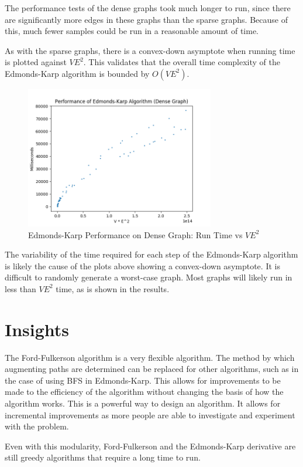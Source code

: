 \documentclass[conference]{IEEEtran}
\begin{document}
The performance tests of the dense graphs took much longer to run, since there are significantly
more edges in these graphs than the sparse graphs. Because of this, much fewer samples could be 
run in a reasonable amount of time. 

As with the sparse graphs, there is a convex-down asymptote when running time is plotted against
$VE^2$. This validates that the overall time complexity of the Edmonds-Karp algorithm is bounded 
by $O(VE^2)$.
\begin{figure}
	\centering
	\includegraphics[width=3.25in]{Edmonds-Karp_Dense.png}
	\caption{Edmonds-Karp Performance on Dense Graph: Run Time vs $VE^2$}
	\label{ff_perf_dense}
\end{figure}

The variability of the time required for each step of the Edmonds-Karp algorithm is likely the 
cause of the plots above showing a convex-down asymptote. It is difficult to randomly generate
a worst-case graph. Most graphs will likely run in less than $VE^2$ time, as is shown in the 
results.

\section{Insights}
The Ford-Fulkerson algorithm is a very flexible algorithm. The method by which augmenting paths 
are determined can be replaced for other algorithms, such as in the case of using BFS in Edmonds-Karp.
This allows for improvements to be made to the efficiency of the algorithm without changing the 
basis of how the algorithm works. This is a powerful way to design an algorithm. It allows for 
incremental improvements as more people are able to investigate and experiment with the problem.

Even with this modularity, Ford-Fulkerson and the Edmonds-Karp derivative are still greedy algorithms
that require a long time to run.
\end{document}
